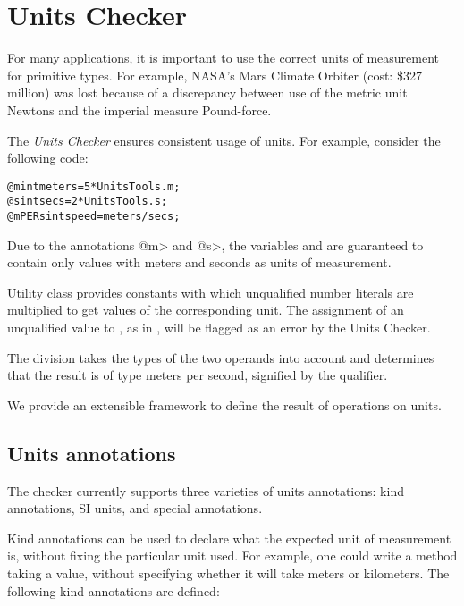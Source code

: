 \htmlhr
\chapter{Units Checker\label{units-checker}}

For many applications, it is important to use the correct units of
measurement for primitive types.  For example, NASA's Mars Climate Orbiter
(cost: \$327 million) was lost because of a discrepancy between use
of the metric unit Newtons and the imperial measure Pound-force.

The \emph{Units Checker} ensures consistent usage of units.
For example, consider the following code:

\begin{alltt}
@m int meters = 5 * UnitsTools.m;
@s int secs = 2 * UnitsTools.s;
@mPERs int speed = meters / secs;
\end{alltt}

Due to the annotations \<@m> and \<@s>, the variables  and
 are guaranteed to contain only values with meters and seconds
as units of measurement.

Utility class  provides constants with which
unqualified number literals are multiplied to get values of the corresponding unit.
The assignment of an unqualified value to , as in
, will be flagged as an error by the Units Checker.

The division  takes the types of the two operands
into account and determines that the result is of type
meters per second, signified by the  qualifier.

We provide an extensible framework to define the result of operations
on units.

\section{Units annotations\label{units-annotations}}

The checker currently supports three varieties of units annotations: kind annotations, SI units, and special annotations.

Kind annotations can be used to declare what the expected unit of
measurement is, without fixing the particular unit used.
For example, one could write a method taking a  value,
without specifying whether it will take meters or kilometers.
The following kind annotations are defined:

